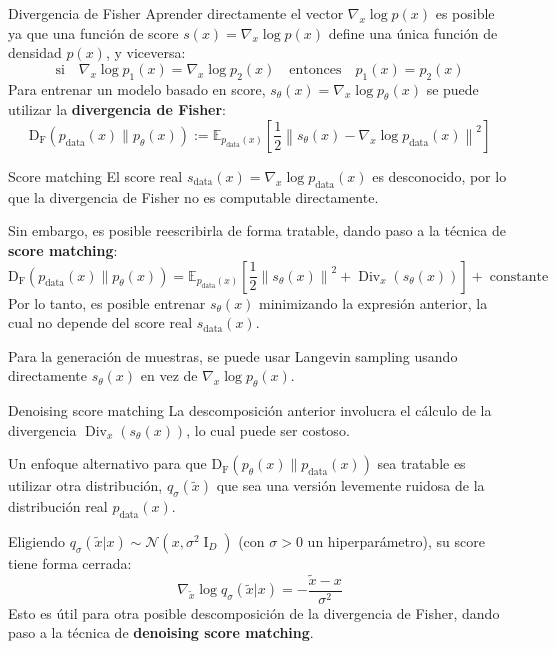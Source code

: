 \documentclass{beamer}
\begin{document}
\begin{frame}{Divergencia de Fisher}
    Aprender directamente el vector $\nabla_x \log p(x)$ es posible ya que una función de score $s(x)=\nabla_x\log p(x)$ define una única función de densidad $p(x)$, y viceversa:
    \begin{equation*}
        \text{si}\quad
        \nabla_x \log p_1(x)=\nabla_x \log p_2(x)
        \quad\text{entonces}\quad
        p_1(x)=p_2(x)
    \end{equation*}
    Para entrenar un modelo basado en score, $s_\theta(x)=\nabla_x\log p_\theta(x)$ se puede utilizar la \textbf{divergencia de Fisher}:
    \begin{equation*}
        \operatorname{D_F}\left(p_{\text{data}}(x)\|p_\theta(x)\right):= \mathbb{E}_{p_{\text{data}}(x)}\left[\frac{1}{2}\left\|s_\theta(x)-\nabla_x\log p_{\text{data}}(x)\right\|^2\right]
    \end{equation*}
\end{frame}

\begin{frame}{Score matching}
    El score real $s_{\text{data}}(x)=\nabla_x\log p_{\text{data}}(x)$ es desconocido, por lo que la divergencia de Fisher no es computable directamente.

    Sin embargo, es posible reescribirla de forma tratable, dando paso a la técnica de \textbf{score matching}:
    \begin{equation*}
        \operatorname{D_F}\left(p_{\text{data}}(x)\|p_\theta(x)\right)= \mathbb{E}_{p_{\text{data}}(x)}\left[\frac{1}{2}\left\|s_\theta(x)\right\|^2 + \operatorname{Div}_x\left( s_\theta(x)\right)\right] + \operatorname{constante}
    \end{equation*}
    Por lo tanto, es posible entrenar $s_\theta(x)$ minimizando la expresión anterior, la cual no depende del score real $s_{\text{data}}(x)$.

    Para la generación de muestras, se puede usar Langevin sampling usando directamente $s_\theta(x)$ en vez de $\nabla_x\log p_\theta(x)$.
\end{frame}

\begin{frame}{Denoising score matching}
    La descomposición anterior involucra el cálculo de la divergencia $\operatorname{Div}_x(s_\theta(x))$, lo cual puede ser costoso.

    Un enfoque alternativo para que $\operatorname{D_F}\left(p_\theta(x)\|p_{\text{data}}(x)\right)$ sea tratable es utilizar otra distribución, $q_\sigma(\tilde x)$ que sea una versión levemente ruidosa de la distribución real $p_{\text{data}}(x)$.

    Eligiendo $q_\sigma(\tilde x| x)\sim \mathcal{N}(x,\sigma^2\operatorname{I}_D)$ (con $\sigma>0$ un hiperparámetro), su score tiene forma cerrada:
    \begin{equation*}
        \nabla_{\tilde x} \log q_\sigma(\tilde x|x)=  -\frac{\tilde x-x}{\sigma^2}
    \end{equation*}
    Esto es útil para otra posible descomposición de la divergencia de Fisher, dando paso a la técnica de \textbf{denoising score matching}.
\end{frame}
\end{document}

